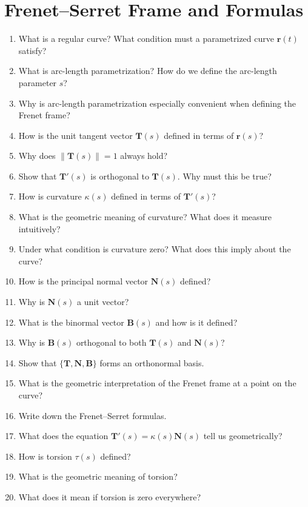 \section{Frenet--Serret Frame and Formulas}

\begin{enumerate}
  \item What is a regular curve? What condition must a parametrized curve $\mathbf{r}(t)$ satisfy?
  \item What is arc-length parametrization? How do we define the arc-length parameter $s$?
  \item Why is arc-length parametrization especially convenient when defining the Frenet frame?
  \item How is the unit tangent vector $\mathbf{T}(s)$ defined in terms of $\mathbf{r}(s)$?
  \item Why does $\|\mathbf{T}(s)\| = 1$ always hold?
  \item Show that $\mathbf{T}'(s)$ is orthogonal to $\mathbf{T}(s)$. Why must this be true?
  \item How is curvature $\kappa(s)$ defined in terms of $\mathbf{T}'(s)$?
  \item What is the geometric meaning of curvature? What does it measure intuitively?
  \item Under what condition is curvature zero? What does this imply about the curve?
  \item How is the principal normal vector $\mathbf{N}(s)$ defined?
  \item Why is $\mathbf{N}(s)$ a unit vector?
  \item What is the binormal vector $\mathbf{B}(s)$ and how is it defined?
  \item Why is $\mathbf{B}(s)$ orthogonal to both $\mathbf{T}(s)$ and $\mathbf{N}(s)$?
  \item Show that $\{\mathbf{T}, \mathbf{N}, \mathbf{B}\}$ forms an orthonormal basis.
  \item What is the geometric interpretation of the Frenet frame at a point on the curve?
  \item Write down the Frenet--Serret formulas.
  \item What does the equation $\mathbf{T}'(s) = \kappa(s)\mathbf{N}(s)$ tell us geometrically?
  \item How is torsion $\tau(s)$ defined?
  \item What is the geometric meaning of torsion?
  \item What does it mean if torsion is zero everywhere?

\end{enumerate}

